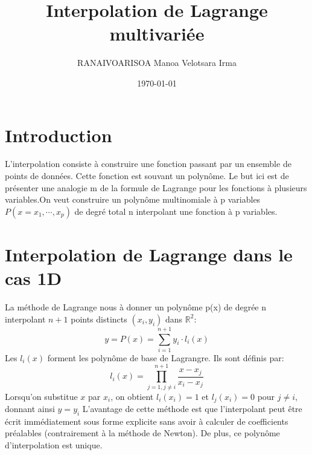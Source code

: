 \documentclass[a4paper,12pt]{article}
\title{Interpolation de Lagrange multivariée}
\author{RANAIVOARISOA Manoa Velotsara Irma}
\date{\today}
\begin{document}
\maketitle


\section{Introduction}
L'interpolation consiste à construire une fonction passant par un ensemble de points de données. Cette fonction est souvant un polynôme. Le but ici est de présenter une analogie m de la formule de Lagrange pour les fonctions à plusieurs variables.On veut construire un polynôme multinomiale à p variables $P(x=x_1,\cdots,x_p)$ de degré total n interpolant une fonction à p variables.

\section{Interpolation de Lagrange dans le cas 1D}
La méthode de Lagrange nous à donner un polynôme p(x) de degrée n interpolant $n+1$ points distincts $(x_i, y_i)$ dans $\mathbb{R}^2$:
\begin{equation} 
y = P(x) = \sum_{i=1}^{n+1} y_i \cdot l_i(x) 
\end{equation}  
Les $l_i(x)$ forment les polynôme de base de Lagrangre. Ils sont définis par:
\begin{equation}
l_i(x)= \prod_{j=1, j \neq i}^{n+1} \frac{x - x_j}{x_i - x_j}
\end{equation}
Lorsqu'on substitue $x$ par $x_i$, on obtient $l_i(x_i) = 1$ et $l_j(x_i) = 0$ pour $j \neq i$, donnant ainsi $y = y_i$
L'avantage de cette méthode est que l'interpolant peut être écrit immédiatement sous forme explicite sans avoir à calculer de coefficients préalables (contrairement à la méthode de Newton). De plus, ce polynôme d'interpolation est unique.
\end{document}
